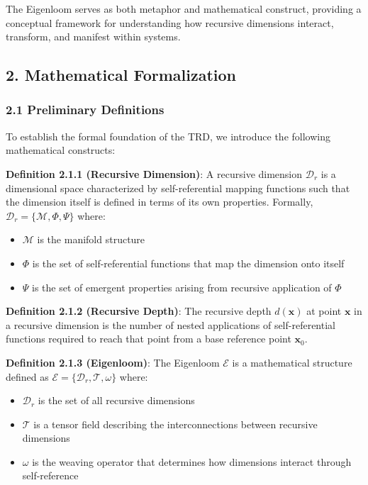 \documentclass[
]{article}
\providecommand{\tightlist}{%
  \setlength{\itemsep}{0pt}\setlength{\parskip}{0pt}}
\begin{document}
The Eigenloom serves as both metaphor and mathematical construct,
providing a conceptual framework for understanding how recursive
dimensions interact, transform, and manifest within systems.

\subsection{2. Mathematical
Formalization}\label{mathematical-formalization-2}

\subsubsection{2.1 Preliminary
Definitions}\label{preliminary-definitions}

To establish the formal foundation of the TRD, we introduce the
following mathematical constructs:

\textbf{Definition 2.1.1 (Recursive Dimension)}: A recursive dimension
\(\mathcal{D}_r\) is a dimensional space characterized by
self-referential mapping functions such that the dimension itself is
defined in terms of its own properties. Formally,
\(\mathcal{D}_r = \{\mathcal{M}, \Phi, \Psi\}\) where:

\begin{itemize}
\tightlist
\item
  \(\mathcal{M}\) is the manifold structure
\item
  \(\Phi\) is the set of self-referential functions that map the
  dimension onto itself
\item
  \(\Psi\) is the set of emergent properties arising from recursive
  application of \(\Phi\)
\end{itemize}

\textbf{Definition 2.1.2 (Recursive Depth)}: The recursive depth
\(d(\mathbf{x})\) at point \(\mathbf{x}\) in a recursive dimension is
the number of nested applications of self-referential functions required
to reach that point from a base reference point \(\mathbf{x}_0\).

\textbf{Definition 2.1.3 (Eigenloom)}: The Eigenloom \(\mathcal{E}\) is
a mathematical structure defined as
\(\mathcal{E} = \{\mathcal{D}_r, \mathcal{T}, \omega\}\) where:

\begin{itemize}
\tightlist
\item
  \(\mathcal{D}_r\) is the set of all recursive dimensions
\item
  \(\mathcal{T}\) is a tensor field describing the interconnections
  between recursive dimensions
\item
  \(\omega\) is the weaving operator that determines how dimensions
  interact through self-reference
\end{itemize}
\end{document}

